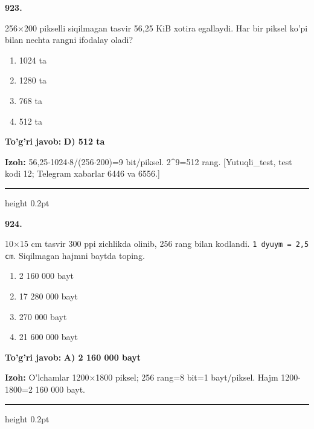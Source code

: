 \documentclass[10pt,a4paper,oneside]{article}
\begin{document}
\noindent\textbf{\color{ink}923.}
\par
256\ensuremath{\times}200 pikselli siqilmagan tasvir 56,25 KiB xotira egallaydi. Har bir piksel ko'pi bilan nechta rangni ifodalay oladi?
\begin{enumerate}[label=\Alph*),leftmargin=9mm]
\item 1024 ta
\item 1280 ta
\item 768 ta
\item 512 ta
\end{enumerate}
\begin{tcolorbox}[enhanced,breakable,colback=teal!4,colframe=teal!50!black,boxrule=0.5pt,arc=1.1mm,left=3mm,right=3mm,top=1.7mm,bottom=1.7mm,before skip=2mm,after skip=2mm]
\textbf{\color{teal}To'g'ri javob:} \textbf{D) 512 ta}
\par\smallskip
\textbf{Izoh:} 56,25\ensuremath{\cdot}1024\ensuremath{\cdot}8/(256\ensuremath{\cdot}200)=9 bit/piksel. 2\textasciicircum{}9=512 rang. [Yutuqli\_test, test kodi 12; Telegram xabarlar 6446 va 6556.]
\end{tcolorbox}
\vspace{2mm}\hrule height 0.2pt \vspace{3mm}

\noindent\textbf{\color{ink}924.}
\par
10\ensuremath{\times}15 cm tasvir 300 ppi zichlikda olinib, 256 rang bilan kodlandi. \texttt{1 dyuym = 2,5 cm}. Siqilmagan hajmni baytda toping.
\begin{enumerate}[label=\Alph*),leftmargin=9mm]
\item 2 160 000 bayt
\item 17 280 000 bayt
\item 270 000 bayt
\item 21 600 000 bayt
\end{enumerate}
\begin{tcolorbox}[enhanced,breakable,colback=teal!4,colframe=teal!50!black,boxrule=0.5pt,arc=1.1mm,left=3mm,right=3mm,top=1.7mm,bottom=1.7mm,before skip=2mm,after skip=2mm]
\textbf{\color{teal}To'g'ri javob:} \textbf{A) 2 160 000 bayt}
\par\smallskip
\textbf{Izoh:} O'lchamlar 1200\ensuremath{\times}1800 piksel; 256 rang=8 bit=1 bayt/piksel. Hajm 1200\ensuremath{\cdot}1800=2 160 000 bayt.
\end{tcolorbox}
\vspace{2mm}\hrule height 0.2pt \vspace{3mm}
\end{document}
